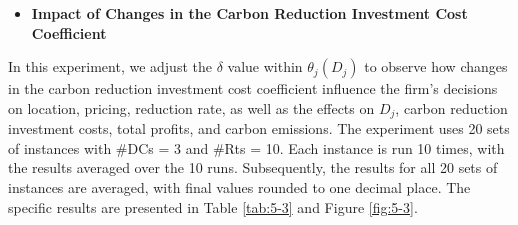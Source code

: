 \documentclass[]{article}
\theoremstyle{plain}%
\theoremstyle{definition}
\theoremstyle{remark}
\theoremstyle{plain}%
\begin{document}
    
    \begin{itemize}
    \item \textbf{Impact of Changes in the Carbon Reduction Investment Cost Coefficient}
    \end{itemize}
    
    In this experiment, we adjust the $\delta$ value within $\theta_j(D_j)$ to observe how changes in the carbon reduction investment cost coefficient influence the firm’s decisions on location, pricing, reduction rate, as well as the effects on $D_j$, carbon reduction investment costs, total profits, and carbon emissions. The experiment uses 20 sets of instances with \#DCs = 3 and \#Rts = 10.  Each instance is run 10 times, with the results averaged over the 10 runs. Subsequently, the results for all 20 sets of instances are averaged, with final values rounded to one decimal place. The specific results are presented in Table \ref{tab:5-3} and Figure \ref{fig:5-3}.
    
\end{document}
